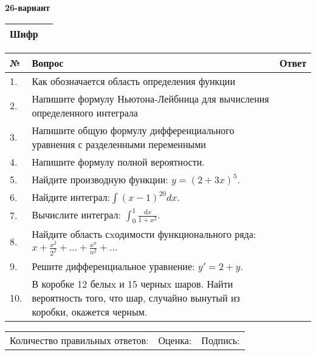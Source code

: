 \documentclass{article}
\begin{document}
  \egroup
  
  \newpage
  
  
  \textbf{26-вариант}\\
  
  \bgroup
  \def\arraystretch{1.6} %
  
  \begin{tabular}{|m{5.7cm}|m{9.5cm}|}
  \hline
  Шифр & \\
  \hline
  \end{tabular}
  
  \vspace{1cm}
  
  \begin{tabular}{|m{0.7cm}|m{10cm}|m{4cm}|}
  \hline
  № & Вопрос & Ответ \\
  \hline
  1. & Как обозначается область определения функции &  \\
  \hline
  2. & Напишите формулу Ньютона-Лейбница для вычисления определенного интеграла &  \\
  \hline
  3. & Напишите общую формулу дифференциального уравнения с разделенными переменными &  \\
  \hline
  4. & Напишите формулу полной вероятности. &  \\
  \hline
  5. & Найдите производную функции: \(y = (2 + 3x)^{5}\). &  \\
  \hline
  6. & Найдите интеграл:\(\int{(x - 1)^{20}}dx\). &  \\
  \hline
  7. & Вычислите интеграл: \(\int_{0}^{1}\frac{dx}{1 + x^{2}}\). &  \\
  \hline
  8. & Найдите область сxодимости функционального ряда: \(x + \frac{x^{2}}{2^{2}} + ... + \frac{x^{n}}{n^{2}} + ...\) &  \\
  \hline
  9. & Решите дифференциальное уравнение: \(y' = 2 + y\). &  \\
  \hline
  10. & В коробке 12 белыx и 15 черныx шаров. Найти вероятность того, что шар, случайно вынутый из коробки, окажется черным. &  \\
  \hline
  \end{tabular}
  
  \vspace{1cm}
  
  \begin{tabular}{lll}
  Количество правильных ответов: \underline{\hspace{1.5cm}} & 
  Оценка: \underline{\hspace{1.5cm}} & 
  Подпись: \underline{\hspace{2cm}} \\
  \end{tabular}
  
\end{document}
